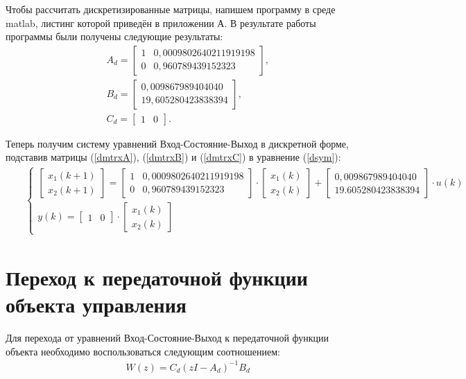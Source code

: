 \documentclass[fleqn, a4paper, 11pt, russian]{article}
\begin{document}
	Чтобы рассчитать дискретизированные матрицы, напишем программу в среде matlab, листинг которой приведён в приложении А. В результате работы программы были получены следующие результаты:
	\begin{align}
		\label{dmtrxA}
		&&A_d = \begin{bmatrix}
			1 & 0,0009802640211919198\\
			0 & 0,960789439152323
		\end{bmatrix},\\
		\label{dmtrxB}
		&&B_d = \begin{bmatrix}
			0,009867989404040\\
			19,605280423838394
		\end{bmatrix},\\
		\label{dmtrxC}
		&&C_d = \begin{bmatrix}
			1 & 0
		\end{bmatrix}.
	\end{align}
	
	Теперь получим систему уравнений Вход-Состояние-Выход в дискретной форме, подставив матрицы (\ref{dmtrxA}), (\ref{dmtrxB}) и (\ref{dmtrxC}) в уравнение (\ref{dsym}):
	\begin{align}
		&&\begin{cases}
			\begin{bmatrix}
				x_1(k+1)\\
				x_2(k+1)
			\end{bmatrix} = \begin{bmatrix}
				1 & 0,0009802640211919198\\
				0 & 0,960789439152323
			\end{bmatrix} \cdot \begin{bmatrix}
				x_1(k)\\
				x_2(k)
			\end{bmatrix} + \begin{bmatrix}
				0,009867989404040\\
				19.605280423838394
			\end{bmatrix} \cdot u(k)\\			
			y(k) = \begin{bmatrix}
				1 & 0
			\end{bmatrix} \cdot \begin{bmatrix}
				x_1(k)\\
				x_2(k)
			\end{bmatrix}
		\end{cases}
	\end{align}
	\clearpage
	\section{Переход к передаточной функции объекта управления}
	Для перехода от уравнений Вход-Состояние-Выход к передаточной функции объекта необходимо воспользоваться следующим соотношением:
	\begin{align}
		&&W(z) = C_d(zI - A_d)^{-1}B_d
	\end{align}
	
\end{document}
